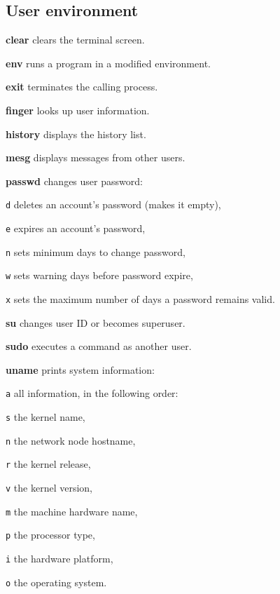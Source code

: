 \subsection*{User environment}
\begin{enumx}
	\item [\cmd] \textbf{clear} clears the terminal screen.
	\item [\cmd] \textbf{env} runs a program in a modified environment.
	\item [\cmd] \textbf{exit} terminates the calling process.
	\item [\cmd] \textbf{finger} looks up user information.
	\item [\cmd] \textbf{history}  displays the history list. %
	\item [\cmd] \textbf{mesg} displays messages from other users.
\end{enumx}

\manualbreak

\begin{enumx}
	\item [\cmd] \textbf{passwd} changes user password:
	\item [\texttt{d}] deletes an account's password (makes it empty),
	\item [\texttt{e}] expires an account's password,
	\item [\texttt{n}] sets minimum days to change password,
	\item [\texttt{w}] sets warning days before password expire,
	\item [\texttt{x}] sets the maximum number of days a password remains valid.
\end{enumx}

\begin{enumx}
	\item [\cmd] \textbf{su} changes user ID or becomes superuser.
	\item [\cmd] \textbf{sudo} executes a command as another user.
\end{enumx}


\begin{enumx}
	\item [\cmd] \textbf{uname} prints system information:
	\item [\texttt{a}] all information, in the following order:
	\item [\texttt{s}] the kernel name,
	\item [\texttt{n}] the network node hostname,
	\item [\texttt{r}] the kernel release,
	\item [\texttt{v}] the kernel version,
	\item [\texttt{m}] the machine hardware name,
	\item [\texttt{p}] the processor type,
	\item [\texttt{i}] the hardware platform,
	\item [\texttt{o}] the operating system.
\end{enumx}


